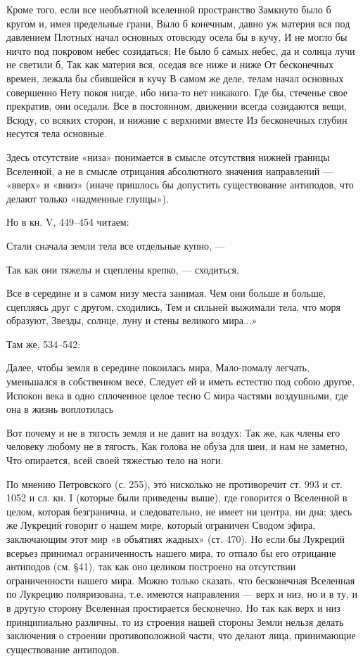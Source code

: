 Кроме того, если все необъятной вселенной пространство Замкнуто было б
кругом и, имея предельные грани, Выло б конечным, давно уж материя вся
под давлением  Плотных начал основных отовсюду  осела бы в кучу,  И не
могло бы ничто  под покровом небес созидаться; Не было  б самых небес,
да и солнца лучи не светили б,  Так как материя вся, оседая все ниже и
ниже От  бесконечных времен,  лежала бы  сбившейся в  кучу В  самом же
деле, телам  начал основных совершенно  Нету покоя нигде,  ибо низа-то
нет  никакого. Где  бы, стеченье  свое прекратив,  они оседали.  Все в
постоянном, движении всегда созидаются  вещи, Всюду, со всяких сторон,
и  нижние  с  верхними  вместе  Из  бесконечных  глубин  несутся  тела
основные.

Здесь отсутствие «низа» понимается  в смысле отсутствия нижней границы
Вселенной, а  не в  смысле отрицания абсолютного  значения направлений
---  «вверх»  и  «вниз»  (иначе пришлось  бы  допустить  существование
антиподов, что делают только «надменные глупцы»).

Но в кн. V, 449--454 читаем:

Стали сначала земли тела все отдельные купно, ---

Так как они тяжелы и сцеплены крепко, --- сходиться,

Все в середине и в самом низу  места занимая. Чем они больше и больше,
сцепляясь друг с  другом, сходились, Тем и сильней  выжимали тела, что
моря образуют, Звезды, солнце, луну и стены великого мира...»

Там же, 534--542:

Далее,  чтобы земля  в середине  покоилась мира,  Мало-помалу легчать,
уменьшался в собственном  весе, Следует ей и иметь  естество под собою
другое,  Испокон века  в одно  сплоченное целое  тесно С  мира частями
воздушными, где она в жизнь воплотилась

Вот почему  и не в  тягость земля  и не давит  на воздух: Так  же, как
члены его человеку любому не в тягость, Как голова не обуза для шеи, и
нам не заметно, Что опирается, всей своей тяжестью тело на ноги.

По мнению Петровского (с. 255),  это нисколько не противоречит ст. 993
и ст. 1052 и сл. кн. I  (которые были приведены выше), где говорится о
Вселенной в целом,  которая безгранична, и следовательно,  не имеет ни
центра,  ни дна;  здесь  же  Лукреций говорит  о  нашем мире,  который
ограничен Сводом эфира, заключающим этот  мир «в объятиях жадных» (ст.
470).  Но  если бы  Лукреций  всерьез  принимал ограниченность  нашего
мира, то  отпало бы  его отрицание  антиподов (см.  §41), так  как оно
целиком  построено на  отсутствии  ограниченности  нашего мира.  Можно
только сказать,  что бесконечная  Вселенная по  Лукрецию поляризована,
т.е.  имеются направления  --- верх  и  низ, но  и  в ту,  и в  другую
сторону  Вселенная простирается  бесконечно.  Но так  как  верх и  низ
принципиально  различны, то  из  строения нашей  стороны Земли  нельзя
делать заключения  о строении противоположной части,  что делают лица,
принимающие существование антиподов.

